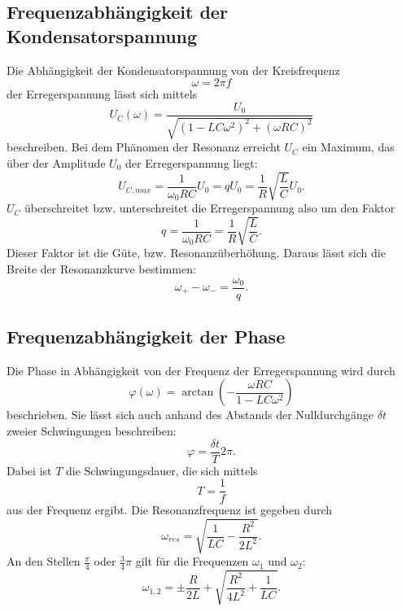 \subsection{Frequenzabhängigkeit der Kondensatorspannung}
Die Abhängigkeit der Kondensatorspannung von der Kreisfrequenz
\begin{equation*}
    \omega = 2\pi f
\end{equation*}
der Erregerspannung lässt sich mittels 
\begin{equation}
    U_{C}(\omega)= \frac{U_{0}}{\sqrt{(1-LC\omega^{2})^{2} + (\omega R C)^{2}}}
\end{equation}
beschreiben.
Bei dem Phänomen der Resonanz erreicht $U_{C}$ ein Maximum, das über der Amplitude $U_{0}$ der Erregerspannung liegt:
\begin{equation}
    U_{C, max} = \frac{1}{\omega_{0}RC} U_{0} = q U_{0} = \frac{1}{R} \sqrt{\frac{L}{C}} U_{0}.
    \label{eqn:ucmax}
\end{equation}
$U_{C}$ überschreitet bzw. unterschreitet die Erregerspannung also um den Faktor 
\begin{equation}
    q = \frac{1}{\omega_{0}RC} = \frac{1}{R} \sqrt{\frac{L}{C}}.
    \label{eqn:q}
\end{equation}
Dieser Faktor ist die Güte, bzw. Resonanzüberhöhung.
Daraus lässt sich die Breite der Resonanzkurve bestimmen:
\begin{equation}
    \omega_{+} - \omega_{-} = \frac{\omega_{0}}{q}.
    \label{eqn:breite}
\end{equation}

\subsection{Frequenzabhängigkeit der Phase}
Die Phase in Abhängigkeit von der Frequenz der Erregerspannung wird durch
\begin{equation*}
    \varphi(\omega) = \arctan(-\frac{\omega RC}{1-LC\omega^2})
\end{equation*}
beschrieben.
Sie lässt sich auch anhand des Abstands der Nulldurchgänge $\delta t$ zweier Schwingungen beschreiben:
\begin{equation}
    \varphi = \frac{\delta t}{T} 2 \pi.
    \label{eqn:phi}
\end{equation}
Dabei ist $T$ die Schwingungsdauer, die sich mittels
\begin{equation*}
    T = \frac{1}{f}
\end{equation*}
aus der Frequenz ergibt.
Die Resonanzfrequenz ist gegeben durch
\begin{equation}
    \omega_{res} = \sqrt{\frac{1}{LC} - \frac{R^2}{2L^2}}.
    \label{eqn:omega_res}
\end{equation}
An den Stellen $\frac{\pi}{4}$ oder $\frac{3}{4} \pi$ gilt für die Frequenzen $\omega_{1}$
und $\omega_{2}$:
\begin{equation}
    \omega_{1,2} = \pm \frac{R}{2L} + \sqrt{\frac{R^2}{4L^2} + \frac{1}{LC}}.
    \label{eqn:omega_12}
\end{equation}